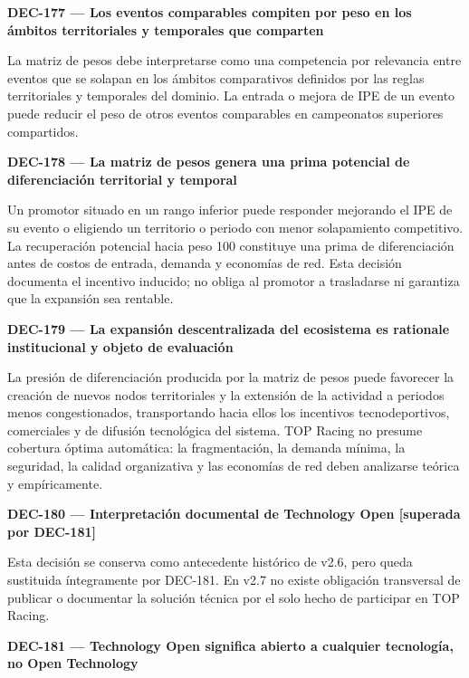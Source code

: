 \documentclass[10pt,letterpaper]{article}
\begin{document}
\noindent\textbf{DEC-177 --- Los eventos comparables compiten por peso en los ámbitos territoriales y temporales que comparten}\par
La matriz de pesos debe interpretarse como una competencia por relevancia entre eventos que se solapan en los ámbitos comparativos definidos por las reglas territoriales y temporales del dominio. La entrada o mejora de IPE de un evento puede reducir el peso de otros eventos comparables en campeonatos superiores compartidos.\par\vspace{0.45em}
\noindent\textbf{DEC-178 --- La matriz de pesos genera una prima potencial de diferenciación territorial y temporal}\par
Un promotor situado en un rango inferior puede responder mejorando el IPE de su evento o eligiendo un territorio o periodo con menor solapamiento competitivo. La recuperación potencial hacia peso 100 constituye una prima de diferenciación antes de costos de entrada, demanda y economías de red. Esta decisión documenta el incentivo inducido; no obliga al promotor a trasladarse ni garantiza que la expansión sea rentable.\par\vspace{0.45em}
\noindent\textbf{DEC-179 --- La expansión descentralizada del ecosistema es rationale institucional y objeto de evaluación}\par
La presión de diferenciación producida por la matriz de pesos puede favorecer la creación de nuevos nodos territoriales y la extensión de la actividad a periodos menos congestionados, transportando hacia ellos los incentivos tecnodeportivos, comerciales y de difusión tecnológica del sistema. TOP Racing no presume cobertura óptima automática: la fragmentación, la demanda mínima, la seguridad, la calidad organizativa y las economías de red deben analizarse teórica y empíricamente.\par\vspace{0.45em}
\noindent\textbf{DEC-180 --- Interpretación documental de Technology Open [superada por DEC-181]}\par
Esta decisión se conserva como antecedente histórico de v2.6, pero queda sustituida íntegramente por DEC-181. En v2.7 no existe obligación transversal de publicar o documentar la solución técnica por el solo hecho de participar en TOP Racing.\par\vspace{0.45em}
\noindent\textbf{DEC-181 --- Technology Open significa abierto a cualquier tecnología, no Open Technology}\par
\end{document}
